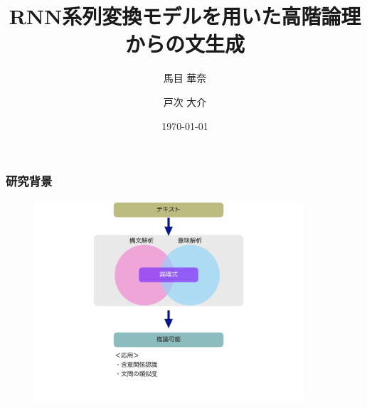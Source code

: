 \documentclass[dvipdfmx,cjk]{beamer}
\title{RNN系列変換モデルを用いた高階論理からの文生成}
\author[]{馬目 華奈\inst{1} \and 戸次 大介\inst{1}}
\institute{\inst{1}戸次研究室}
\date{\today}
\begin{document}
\begin{frame}
  \titlepage
\end{frame}


\begin{frame}
\frametitle{研究背景}
\begin{center}
\begin{figure}[h]
	\includegraphics[width=10cm]{backend1.png}
        \label{fig:backend1}
\end{figure}
\end{center}


\end{frame}
\end{document}
